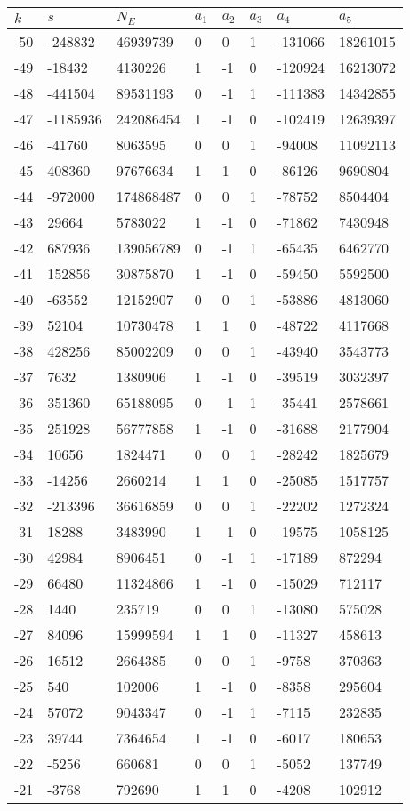 \documentclass{amsart}
\begin{document}
\begin{longtable}{|l|l|l|lllll|}
\hline
$k$ & $s$ & $N_E$ & $a_1$ & $a_2$ & $a_3$ & $a_4$ & $a_5$\\
\hline
-50&-248832&46939739&0&0&1&-131066&18261015\\
-49&-18432&4130226&1&-1&0&-120924&16213072\\
-48&-441504&89531193&0&-1&1&-111383&14342855\\
-47&-1185936&242086454&1&-1&0&-102419&12639397\\
-46&-41760&8063595&0&0&1&-94008&11092113\\
-45&408360&97676634&1&1&0&-86126&9690804\\
-44&-972000&174868487&0&0&1&-78752&8504404\\
-43&29664&5783022&1&-1&0&-71862&7430948\\
-42&687936&139056789&0&-1&1&-65435&6462770\\
-41&152856&30875870&1&-1&0&-59450&5592500\\
-40&-63552&12152907&0&0&1&-53886&4813060\\
-39&52104&10730478&1&1&0&-48722&4117668\\
-38&428256&85002209&0&0&1&-43940&3543773\\
-37&7632&1380906&1&-1&0&-39519&3032397\\
-36&351360&65188095&0&-1&1&-35441&2578661\\
-35&251928&56777858&1&-1&0&-31688&2177904\\
-34&10656&1824471&0&0&1&-28242&1825679\\
-33&-14256&2660214&1&1&0&-25085&1517757\\
-32&-213396&36616859&0&0&1&-22202&1272324\\
-31&18288&3483990&1&-1&0&-19575&1058125\\
-30&42984&8906451&0&-1&1&-17189&872294\\
-29&66480&11324866&1&-1&0&-15029&712117\\
-28&1440&235719&0&0&1&-13080&575028\\
-27&84096&15999594&1&1&0&-11327&458613\\
-26&16512&2664385&0&0&1&-9758&370363\\
-25&540&102006&1&-1&0&-8358&295604\\
-24&57072&9043347&0&-1&1&-7115&232835\\
-23&39744&7364654&1&-1&0&-6017&180653\\
-22&-5256&660681&0&0&1&-5052&137749\\
-21&-3768&792690&1&1&0&-4208&102912\\

\end{longtable}
\end{document}
